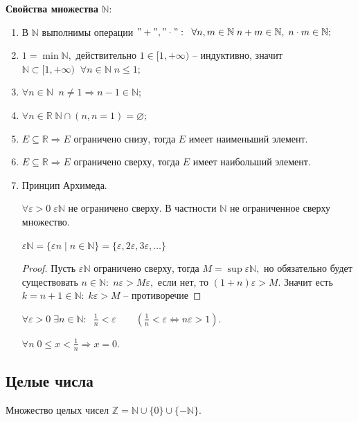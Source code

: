 \par\medskip \textbf{Свойства множества $\mathbb{N}:$}\par
\begin{enumerate}
\item В $\mathbb{N}$ выполнимы операции $"+", "\cdot": \;\; \forall n, m\in\mathbb{N} \; n+m\in\mathbb{N}, \; n\cdot m\in\mathbb{N};$
\item $1=\min\mathbb{N},$ действительно $1\in[1, +\infty)$ -- индуктивно, значит $\mathbb{N}\subset[1, +\infty)\;\; \forall n\in\mathbb{N} \; n\leq1;$
\item $\forall n\in\mathbb{N}\;\; n\neq 1 \Rightarrow n-1\in\mathbb{N};$
\item $\forall n\in\mathbb{R} \; \mathbb{N}\cap (n, n=1)=\varnothing;$
\item $E\subseteq\mathbb{R} \Rightarrow E$ ограничено снизу, тогда $E$ имеет наименьший элемент.
\item $E\subseteq\mathbb{R} \Rightarrow E$ ограничено сверху, тогда $E$ имеет наибольший элемент.
\item Принцип Архимеда.
\par $\forall\varepsilon>0\; \varepsilon\mathbb{N}$ не ограничено сверху. В частности $\mathbb{N}$ не ограниченное сверху множество. 

$\varepsilon\mathbb{N}=\{\varepsilon n\mid n\in\mathbb{N}\}=\{\varepsilon, 2\varepsilon, 3\varepsilon,\ldots\}$
\begin{proof}
Пусть $\varepsilon\mathbb{N}$ ограничено сверху, тогда $M=\sup\varepsilon\mathbb{N},$ но обязательно будет существовать $n\in\mathbb{N}: \; n\varepsilon>M\varepsilon,$ если нет, то $(1+n)\varepsilon>M.$ Значит есть $k=n+1\in\mathbb{N}: \; k\varepsilon>M$ -- противоречие
\end{proof}

\begin{Corollary}
$\forall\varepsilon>0 \; \exists n\in\mathbb{N}: \;\; \frac{1}{n}<\varepsilon \qquad \left(\frac{1}{n}<\varepsilon \Leftrightarrow n\varepsilon>1\right).$
\end{Corollary}

\begin{Corollary}
$\forall n \; 0\leq x<\frac{1}{n} \Rightarrow x=0.$
\end{Corollary}
\end{enumerate}

\subsection{Целые числа}
\begin{Definition}
Множество целых чисел $\mathbb{Z}=\mathbb{N}\cup\{0\}\cup\{-\mathbb{N}\}.$
\end{Definition}

